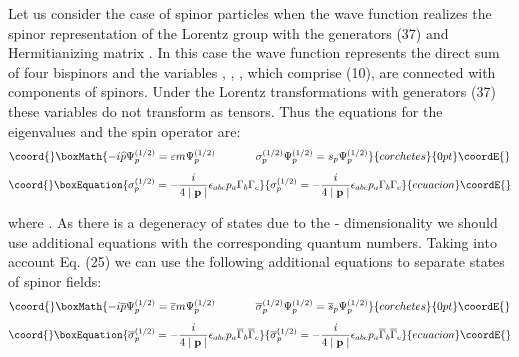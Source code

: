 \documentclass[a4paper,12pt]{article}
\begin{document}
Let us consider the case of spinor particles when the wave
function \coordHE{} realizes the spinor representation of the
Lorentz group with the generators (37) and Hermitianizing matrix
\coordHE{}. In this case the wave function \coordHE{} represents the direct sum of four bispinors and the variables
\coordHE{}, \myHighlight{$\psi _\mu $}\coordHE{}, \myHighlight{$\psi _{[\mu \nu ]},$}\coordHE{}  \myHighlight{$ \widetilde{\psi
}_\mu ,$}\coordHE{}  \coordHE{}, which comprise \coordHE{} (10),
are connected with components of spinors. Under the Lorentz
transformations with generators (37) these variables do not
transform as tensors. Thus the equations for the eigenvalues and
the spin operator are:
\[\coord{}\boxMath{
-i\widehat{p}\Psi _p^{(1/2)}=\varepsilon m\Psi
_p^{(1/2)}\hspace{0.5in} \sigma _p^{(1/2)}\Psi _p^{(1/2)}=s_p\Psi
_p^{(1/2)}
}{corchetes}{0pt}\coordE{}\]
\begin{equation}\coord{}\boxEquation{
\sigma _p^{(1/2)}=-\frac i{4\mid \mathbf{p}\mid }\epsilon _{abc}p_a\Gamma
_b\Gamma _c  \label{50}
}{
\sigma _p^{(1/2)}=-\frac i{4\mid \mathbf{p}\mid }\epsilon _{abc}p_a\Gamma
_b\Gamma _c  }{ecuacion}\coordE{}\end{equation}

where \coordHE{}. As there is a degeneracy of states due to the \coordHE{} -
dimensionality we should use additional equations with the corresponding
quantum numbers. Taking into account Eq. (25) we can use the following
additional equations to separate states of spinor fields:
\[\coord{}\boxMath{
-i\overline{p}\Psi _p^{(1/2)}=\overline{\varepsilon }m\Psi
_p^{(1/2)} \hspace{0.5in}\overline{\sigma }_p^{(1/2)}\Psi
_p^{(1/2)}=\overline{s}_p\Psi _p^{(1/2)}
}{corchetes}{0pt}\coordE{}\]
\begin{equation}\coord{}\boxEquation{
\overline{\sigma }_p^{(1/2)}=-\frac i{4\mid \mathbf{p}\mid }\epsilon
_{abc}p_a\overline{\Gamma }_b\overline{\Gamma }_c  \label{51}
}{
\overline{\sigma }_p^{(1/2)}=-\frac i{4\mid \mathbf{p}\mid }\epsilon
_{abc}p_a\overline{\Gamma }_b\overline{\Gamma }_c  }{ecuacion}\coordE{}\end{equation}
\end{document}
